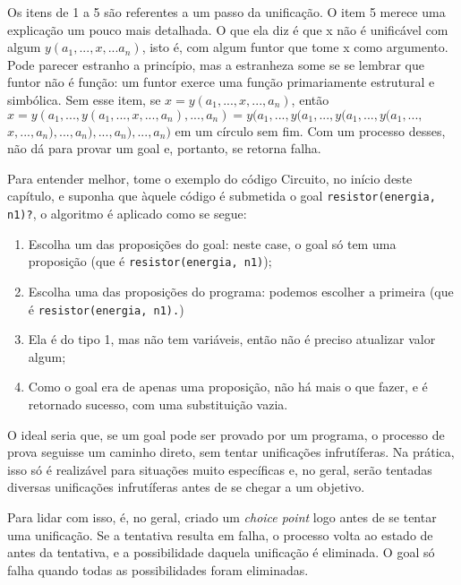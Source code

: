 \documentclass{article}
\theoremstyle{remark}
\theoremstyle{theorem}
\begin{document}
Os itens de 1 a 5 são referentes a um passo da unificação.
O item 5 merece uma explicação um pouco mais detalhada. O que ela diz é que x não é unificável com algum $y(a_1, ...,x, ...a_n)$, isto é, com algum funtor que tome x como argumento. Pode parecer estranho a princípio, mas a estranheza some se se lembrar que funtor não é função: um funtor exerce uma função primariamente estrutural e simbólica. Sem esse item, se $x = y(a_1, ..., x, ..., a_n)$, então $x = y(a_1, ...,y(a_1, ..., x, ..., a_n) , ..., a_n) = y(a_1, ...,y(a_1, ...,y(a_1, ...,y(a_1,
...,$
$x, ..., a_n) , ..., a_n) , ..., a_n) , ..., a_n)$ em um círculo sem fim. Com um processo desses, não dá para provar um goal e, portanto, se retorna falha.

Para entender melhor, tome o exemplo do código Circuito, no início deste capítulo, e suponha que àquele código é submetida o goal {\tt resistor(energia, n1)?}, o algoritmo é aplicado como se segue:

  \begin{enumerate}
    \item Escolha um das proposições do goal: neste case, o goal só tem uma proposição (que é {\tt resistor(energia, n1)});
    \item Escolha uma das proposições do programa: podemos escolher a primeira (que é {\tt resistor(energia, n1).})
    \item Ela é do tipo 1, mas não tem variáveis, então não é preciso atualizar valor algum;
    \item Como o goal era de apenas uma proposição, não há mais o que fazer, e é retornado sucesso, com uma substituição vazia.
  \end{enumerate}

  O ideal seria que, se um goal pode ser provado por um programa, o processo de prova seguisse um caminho direto, sem tentar unificações infrutíferas. Na prática, isso só é realizável para situações muito específicas e, no geral, serão tentadas diversas unificações infrutíferas antes de se chegar a um objetivo.

Para lidar com isso, é, no geral, criado um {\it choice point} logo antes de se tentar uma unificação. Se a tentativa resulta em falha, o processo volta ao estado de antes da tentativa, e a possibilidade daquela unificação é eliminada. O goal só falha quando todas as possibilidades foram eliminadas.
\end{document}
